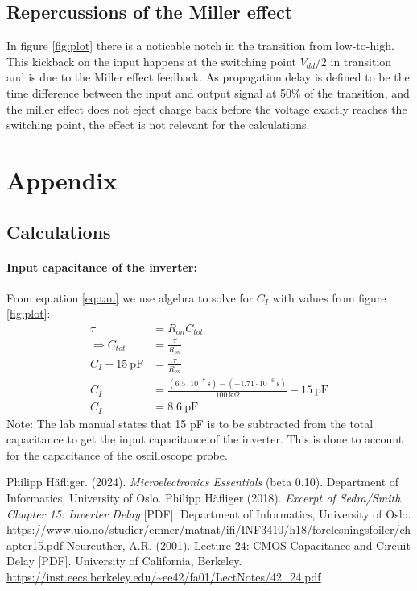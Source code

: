 \documentclass[onecolumn]{article}
\begin{document}
\subsection{Repercussions of the Miller effect}
In figure \ref{fig:plot} there is a noticable notch in the transition from low-to-high. This kickback on the input happens at the switching point $V_{dd}/2$ in transition and is due to the Miller effect feedback. As propagation delay is defined to be the time difference between the input and output signal at 50\% of the transition, and the miller effect does not eject charge back before the voltage exactly reaches the switching point, the effect is not relevant for the calculations.

\section{Appendix}
\subsection{Calculations}
\paragraph{Input capacitance of the inverter:}
From equation \ref{eq:tau} we use algebra to solve for $C_{I}$ with values from figure \ref{fig:plot}:
\begin{align}
    \tau &= R_{on}C_{tot} \nonumber \\
    \Rightarrow C_{tot} &= \frac{\tau}{R_{on}} \nonumber \\
    C_{I} + 15 \ \text{pF} &= \frac{\tau}{R_{on}} \nonumber \\
    C_{I} &= \frac{(6.5\cdot 10^{-7} \ \text{s}) - (-1.71 \cdot 10^{-6} \ \text{s})}{100 \ \text{k}\Omega} - 15 \ \text{pF}\nonumber \\
    C_{I} &= 8.6 \ \text{pF} \nonumber
\end{align}
Note: The lab manual states that 15 pF is to be subtracted from the total capacitance to get the input capacitance of the inverter. This is done to account for the capacitance of the oscilloscope probe.

\begin{thebibliography}{9}
 Philipp Häfliger. (2024). \textit{Microelectronics Essentials} (beta 0.10). Department of Informatics, University of Oslo.
 Philipp Häfliger (2018). \textit{Excerpt of Sedra/Smith Chapter 15: Inverter Delay} [PDF].  Department of Informatics, University of Oslo. \url{https://www.uio.no/studier/emner/matnat/ifi/INF3410/h18/forelesningsfoiler/chapter15.pdf}
 Neureuther, A.R. (2001). Lecture 24: CMOS Capacitance and Circuit Delay [PDF]. University of California, Berkeley. \url{https://inst.eecs.berkeley.edu/~ee42/fa01/LectNotes/42_24.pdf}
\end{thebibliography}
\end{document}
